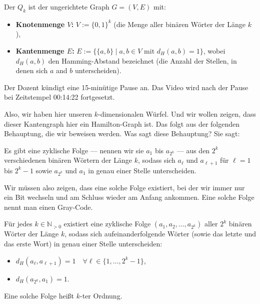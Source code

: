 \begin{math-stroke}
\begin{definition}\label{def:qk-formal}
Der  $Q_k$ ist der ungerichtete Graph $G = (V, E)$ mit:
\begin{itemize}
    \item \textbf{Knotenmenge $V$:} $V := \{0, 1\}^k$ (die Menge aller binären Wörter der Länge $k$),
    \item \textbf{Kantenmenge $E$:} $E := \{\{a, b\} \mid a, b \in V \text{ mit } d_H(a, b) = 1\}$, wobei $d_H(a, b)$ den Hamming-Abstand bezeichnet (die Anzahl der Stellen, in denen sich $a$ and $b$ unterscheiden).
\end{itemize}
\end{definition}
\end{math-stroke}

\begin{lecture-break}[Vorlesungspause]
Der Dozent kündigt eine 15-minütige Pause an. Das Video wird nach der Pause bei Zeitstempel 00:14:22 fortgesetzt.
\end{lecture-break}

\begin{spoken-clean}[00:43:56 - 00:46:03]
Also, wir haben hier unseren $k$-dimensionalen Würfel. Und wir wollen zeigen, dass dieser Kantengraph hier ein Hamilton-Graph ist. Das folgt aus der folgenden Behauptung, die wir beweisen werden. Was sagt diese Behauptung? Sie sagt:

Es gibt eine zyklische Folge --- nennen wir sie $a_1$ bis $a_{2^k}$ --- aus den $2^k$ verschiedenen binären Wörtern der Länge $k$, sodass sich $a_\ell$ und $a_{\ell+1}$ für $\ell = 1$ bis $2^k - 1$ sowie $a_{2^k}$ und $a_1$ in genau einer Stelle unterscheiden.

Wir müssen also zeigen, dass eine solche Folge existiert, bei der wir immer nur ein Bit wechseln und am Schluss wieder am Anfang ankommen. Eine solche Folge nennt man einen Gray-Code.
\end{spoken-clean}

\begin{math-stroke}
\begin{proposition}\label{prop:gray-code-existenz}
Für jedes $k \in \mathbb{N}_{>0}$ existiert eine zyklische Folge $(a_1, a_2, \dots, a_{2^k})$ aller $2^k$ binären Wörter der Länge $k$, sodass sich aufeinanderfolgende Wörter (sowie das letzte und das erste Wort) in genau einer Stelle unterscheiden:
\begin{itemize}
    \item $d_H(a_\ell, a_{\ell+1}) = 1 \quad \forall \ell \in \{1, \dots, 2^k-1\}$,
    \item $d_H(a_{2^k}, a_1) = 1$.
\end{itemize}
Eine solche Folge heißt  $k$-ter Ordnung.
\end{proposition}
\end{math-stroke}

